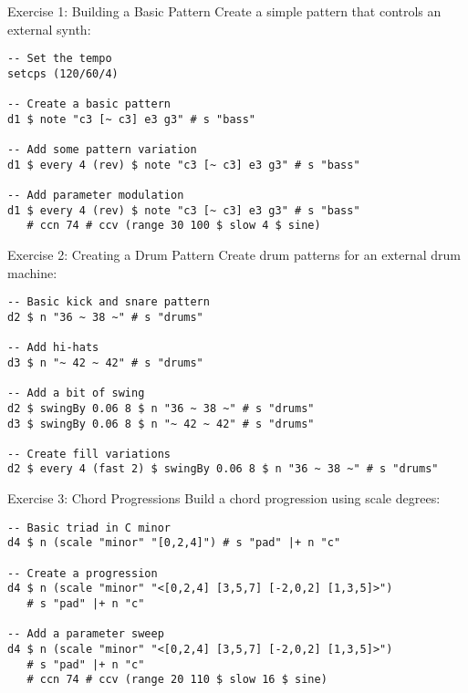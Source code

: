 \documentclass{beamer}
\begin{document}

\begin{frame}[fragile]{Exercise 1: Building a Basic Pattern}
Create a simple pattern that controls an external synth:

\begin{lstlisting}[style=tidal]
-- Set the tempo
setcps (120/60/4)

-- Create a basic pattern
d1 $ note "c3 [~ c3] e3 g3" # s "bass"

-- Add some pattern variation
d1 $ every 4 (rev) $ note "c3 [~ c3] e3 g3" # s "bass"

-- Add parameter modulation
d1 $ every 4 (rev) $ note "c3 [~ c3] e3 g3" # s "bass"
   # ccn 74 # ccv (range 30 100 $ slow 4 $ sine)
\end{lstlisting}
\end{frame}

\begin{frame}[fragile]{Exercise 2: Creating a Drum Pattern}
Create drum patterns for an external drum machine:

\begin{lstlisting}[style=tidal]
-- Basic kick and snare pattern
d2 $ n "36 ~ 38 ~" # s "drums"

-- Add hi-hats
d3 $ n "~ 42 ~ 42" # s "drums"

-- Add a bit of swing
d2 $ swingBy 0.06 8 $ n "36 ~ 38 ~" # s "drums"
d3 $ swingBy 0.06 8 $ n "~ 42 ~ 42" # s "drums"

-- Create fill variations
d2 $ every 4 (fast 2) $ swingBy 0.06 8 $ n "36 ~ 38 ~" # s "drums"
\end{lstlisting}
\end{frame}

\begin{frame}[fragile]{Exercise 3: Chord Progressions}
Build a chord progression using scale degrees:

\begin{lstlisting}[style=tidal]
-- Basic triad in C minor
d4 $ n (scale "minor" "[0,2,4]") # s "pad" |+ n "c"

-- Create a progression
d4 $ n (scale "minor" "<[0,2,4] [3,5,7] [-2,0,2] [1,3,5]>") 
   # s "pad" |+ n "c"

-- Add a parameter sweep
d4 $ n (scale "minor" "<[0,2,4] [3,5,7] [-2,0,2] [1,3,5]>") 
   # s "pad" |+ n "c"
   # ccn 74 # ccv (range 20 110 $ slow 16 $ sine)
\end{lstlisting}
\end{frame}
\end{document}
